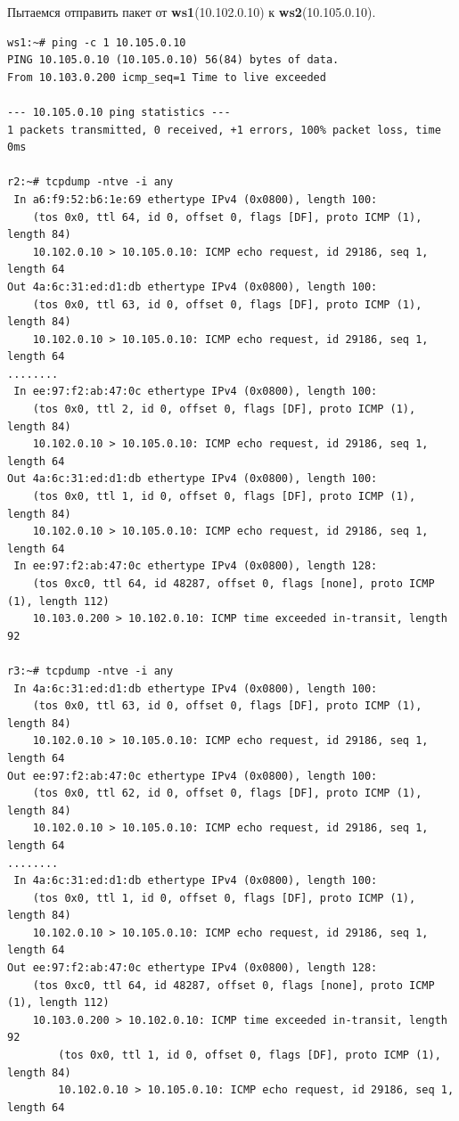 \documentclass[a4paper,12pt]{article}
\begin{document}
Пытаемся отправить пакет от \textbf{ws1}(10.102.0.10) к \textbf{ws2}(10.105.0.10).

\begin{Verbatim}
ws1:~# ping -c 1 10.105.0.10
PING 10.105.0.10 (10.105.0.10) 56(84) bytes of data.
From 10.103.0.200 icmp_seq=1 Time to live exceeded

--- 10.105.0.10 ping statistics ---
1 packets transmitted, 0 received, +1 errors, 100% packet loss, time 0ms

r2:~# tcpdump -ntve -i any
 In a6:f9:52:b6:1e:69 ethertype IPv4 (0x0800), length 100:
    (tos 0x0, ttl 64, id 0, offset 0, flags [DF], proto ICMP (1), length 84)
    10.102.0.10 > 10.105.0.10: ICMP echo request, id 29186, seq 1, length 64
Out 4a:6c:31:ed:d1:db ethertype IPv4 (0x0800), length 100:
    (tos 0x0, ttl 63, id 0, offset 0, flags [DF], proto ICMP (1), length 84)
    10.102.0.10 > 10.105.0.10: ICMP echo request, id 29186, seq 1, length 64
........
 In ee:97:f2:ab:47:0c ethertype IPv4 (0x0800), length 100:
    (tos 0x0, ttl 2, id 0, offset 0, flags [DF], proto ICMP (1), length 84)
    10.102.0.10 > 10.105.0.10: ICMP echo request, id 29186, seq 1, length 64
Out 4a:6c:31:ed:d1:db ethertype IPv4 (0x0800), length 100:
    (tos 0x0, ttl 1, id 0, offset 0, flags [DF], proto ICMP (1), length 84)
    10.102.0.10 > 10.105.0.10: ICMP echo request, id 29186, seq 1, length 64
 In ee:97:f2:ab:47:0c ethertype IPv4 (0x0800), length 128:
    (tos 0xc0, ttl 64, id 48287, offset 0, flags [none], proto ICMP (1), length 112)
    10.103.0.200 > 10.102.0.10: ICMP time exceeded in-transit, length 92

r3:~# tcpdump -ntve -i any
 In 4a:6c:31:ed:d1:db ethertype IPv4 (0x0800), length 100:
    (tos 0x0, ttl 63, id 0, offset 0, flags [DF], proto ICMP (1), length 84)
    10.102.0.10 > 10.105.0.10: ICMP echo request, id 29186, seq 1, length 64
Out ee:97:f2:ab:47:0c ethertype IPv4 (0x0800), length 100:
    (tos 0x0, ttl 62, id 0, offset 0, flags [DF], proto ICMP (1), length 84)
    10.102.0.10 > 10.105.0.10: ICMP echo request, id 29186, seq 1, length 64
........
 In 4a:6c:31:ed:d1:db ethertype IPv4 (0x0800), length 100:
    (tos 0x0, ttl 1, id 0, offset 0, flags [DF], proto ICMP (1), length 84)
    10.102.0.10 > 10.105.0.10: ICMP echo request, id 29186, seq 1, length 64
Out ee:97:f2:ab:47:0c ethertype IPv4 (0x0800), length 128:
    (tos 0xc0, ttl 64, id 48287, offset 0, flags [none], proto ICMP (1), length 112)
    10.103.0.200 > 10.102.0.10: ICMP time exceeded in-transit, length 92
        (tos 0x0, ttl 1, id 0, offset 0, flags [DF], proto ICMP (1), length 84)
	    10.102.0.10 > 10.105.0.10: ICMP echo request, id 29186, seq 1, length 64
\end{Verbatim}
\end{document}
